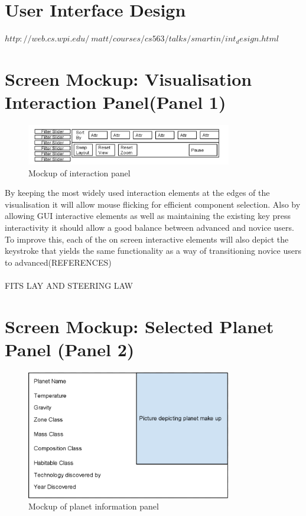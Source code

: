 \documentclass[11pt
              , a4paper
              , twoside
              , openright
              ]{report}
\begin{document}
\section{User Interface Design}
$http://web.cs.wpi.edu/~matt/courses/cs563/talks/smartin/int_design.html$
\section{Screen Mockup: Visualisation Interaction Panel(Panel 1)}

\begin{figure}[h!]
  \centering
      \includegraphics[width=0.8\textwidth]{images/interaction_mock.jpg}
  \caption{Mockup of interaction panel}
\end{figure}

By keeping the most widely used interaction elements at the edges of the visualisation it will allow mouse flicking for efficient component selection. Also by allowing GUI interactive elements as well as maintaining the existing key press interactivity it should allow a good balance between advanced and novice users. To improve this, each of the on screen interactive elements will also depict the keystroke that yields the same functionality as a way of transitioning novice users to advanced(REFERENCES)
\\\\
FITS LAY AND STEERING LAW
\section{Screen Mockup: Selected Planet Panel (Panel 2)}
\begin{figure}[H]
  \centering
      \includegraphics[width=0.8\textwidth]{images/planet_mock.jpg}
  \caption{Mockup of planet information panel}
\end{figure}
\end{document}
